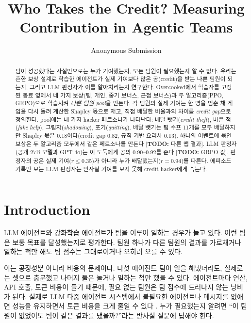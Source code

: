 \documentclass[letterpaper]{article} %
\title{Who Takes the Credit? Measuring Contribution in Agentic Teams}
\author{
    Anonymous Submission
}
\newcommand{\TODO}[1]{[\textbf{TODO:} #1]}
\begin{document}
\maketitle

\begin{abstract}
팀이 성공했다는 사실만으로는 누가 기여했는지, 모든 팀원이 필요했는지 알 수 없다. 우리는 흔한 보상
설계로 학습한 에이전트가 실제 기여보다 많은 공(credit)을 받는 나쁜 팀원이 되는지, 그리고 LLM 판정자가
이를 알아차리는지 연구한다. Overcooked에서 학습자를 고정된 동료 옆에서 네 가지 보상(팀, 개인, 줍기 보너스,
근접 보너스)과 두 알고리즘(PPO, GRPO)으로 학습시켜 \emph{나쁜 팀원 pool}을 만든다. 각 팀원의 실제 기여는
한 명을 멈춘 채 게임을 다시 돌려 계산한 Shapley 몫으로 재고, 직접 배달한 비율과의 차이를 \emph{credit gap}으로
정의한다. pool에는 네 가지 hacker 페르소나가 나타난다: 배달 뺏기(\emph{credit theft}), 바쁜 척(\emph{fake help}),
그림자(\emph{shadowing}), 포기(\emph{quitting}). 배달 뺏기는 팀 수프 11개를 모두 배달하지만 Shapley 몫은
0.18이다(credit gap 0.82, 규칙 기반 요리사 0.13). 하나의 이벤트에 묶인 보상은 두 알고리즘 모두에서 같은
페르소나를 만든다 \TODO{다른 맵 결과}. LLM 판정자(공개 27B 모델과 GPT-4o)는 이 도둑에게 공의 0.90--0.92를
준다 \TODO{GRPO 값}. 판정자의 공은 실제 기여($r\le0.35$)가 아니라 누가 배달했는지($r=0.94$)를 따른다.
에피소드 기록만 보는 LLM 판정자는 반사실 기여를 보지 못해 credit hacker에게 속는다.
\end{abstract}

\begin{links}
\end{links}

\section{Introduction}
LLM 에이전트와 강화학습 에이전트가 팀을 이루어 일하는 경우가 늘고 있다.
이런 팀은 보통 목표를 달성했는지로 평가한다. 팀원 하나가 다른 팀원의 결과를 가로채거나 일하는 척만
해도 팀 점수는 그대로이거나 오히려 오를 수 있다.

이는 공정성뿐 아니라 비용의 문제이다. 다섯 에이전트 팀이 일을 해냈더라도, 실제로는 셋으로 충분했고
나머지 둘은 놀거나 일하는 척만 했을 수 있다. 에이전트마다 연산, API 호출, 토큰 비용이 들기 때문에,
필요 없는 팀원은 팀 점수에 드러나지 않는 낭비가 된다. 실제로 LLM 다중 에이전트 시스템에서 불필요한
에이전트나 메시지를 없애면 성능을 유지하면서 토큰 비용을 크게 줄일 수 있다
\cite{zhang2025cutthecrap,wang2025agentdropout}. 누가 필요했는지 알려면 ``이 팀원이 없었어도 팀이 같은
결과를 냈을까?''라는 반사실 질문에 답해야 한다.
\end{document}
